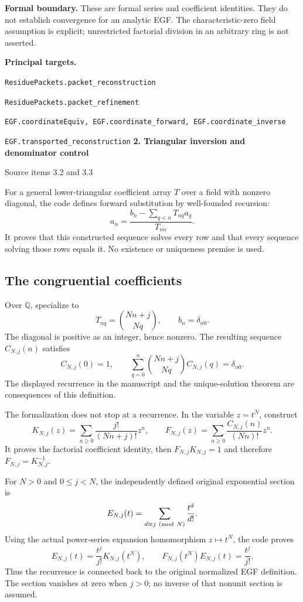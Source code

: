 \documentclass[11pt]{article}
\newcommand{\Q}{\mathbb Q}\newcommand{\Z}{\mathbb Z}\newcommand{\N}{\mathbb N}
\newcommand{\target}[1]{{\footnotesize\texttt{#1}}}
\newcommand{\pageheading}[2]{{\Large\bfseries\color{ink}#1}\par{\small #2}\par\medskip}
\begin{document}
\textbf{Formal boundary.} These are formal series and coefficient identities. They do not establish convergence for an analytic EGF. The characteristic-zero field assumption is explicit; unrestricted factorial division in an arbitrary ring is not asserted.

\textbf{Principal targets.}\par
\target{ResiduePackets.packet\_reconstruction}\par
\target{ResiduePackets.packet\_refinement}\par
\target{EGF.coordinateEquiv, EGF.coordinate\_forward, EGF.coordinate\_inverse}\par
\target{EGF.transported\_reconstruction}
\newpage
\pageheading{2. Triangular inversion and denominator control}{Source items 3.2 and 3.3}
For a general lower-triangular coefficient array $T$ over a field with nonzero diagonal, the code defines forward substitution by well-founded recursion:
\[
 a_n=\frac{b_n-\sum_{q<n}T_{nq}a_q}{T_{nn}}.
\]
It proves that this constructed sequence solves every row and that every sequence solving those rows equals it. No existence or uniqueness premise is used.

\subsection*{The congruential coefficients}
Over $\Q$, specialize to
\[
 T_{nq}=\binom{Nn+j}{Nq},\qquad b_n=\delta_{n0}.
\]
The diagonal is positive as an integer, hence nonzero. The resulting sequence $C_{N,j}(n)$ satisfies
\[
 C_{N,j}(0)=1,\qquad
 \sum_{q=0}^{n}\binom{Nn+j}{Nq}C_{N,j}(q)=\delta_{n0}.
\]
The displayed recurrence in the manuscript and the unique-solution theorem are consequences of this definition.

The formalization does not stop at a recurrence. In the variable $z=t^N$, construct
\[
 K_{N,j}(z)=\sum_{n\ge0}\frac{j!}{(Nn+j)!}z^n,\qquad
 F_{N,j}(z)=\sum_{n\ge0}\frac{C_{N,j}(n)}{(Nn)!}z^n.
\]
It proves the factorial coefficient identity, then $F_{N,j}K_{N,j}=1$ and therefore $F_{N,j}=K_{N,j}^{-1}$.

For $N>0$ and $0\le j<N$, the independently defined original exponential section is
\[
 E_{N,j}(t)=\sum_{d\equiv j\ ({\rm mod}\ N)}\frac{t^d}{d!}.
\]
Using the actual power-series expansion homomorphism $z\mapsto t^N$, the code proves
\[
 E_{N,j}(t)=\frac{t^j}{j!}K_{N,j}(t^N),\qquad
 \boxed{F_{N,j}(t^N)E_{N,j}(t)=\frac{t^j}{j!}.}
\]
Thus the recurrence is connected back to the original normalized EGF definition. The section vanishes at zero when $j>0$; no inverse of that nonunit section is assumed.
\end{document}
